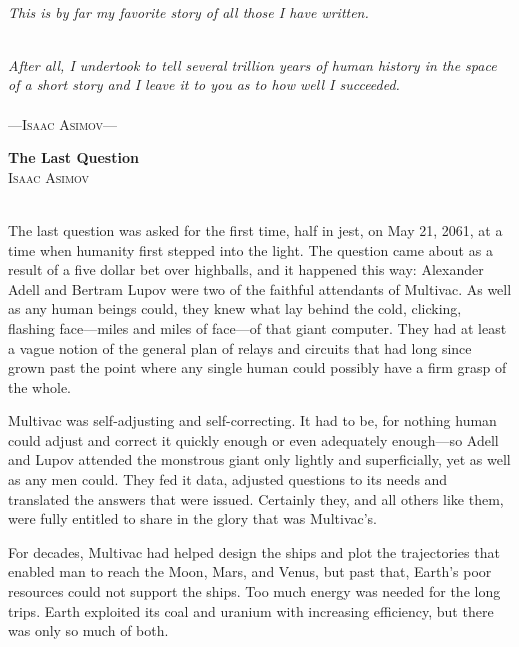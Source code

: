 \documentclass[11pt,twocolumn,paper=a5,pagesize,twoside]{article}
\newcommand{\initial}[1]{ \lettrine[lines=3,lhang=0.3,nindent=0em]{  {\textsf{#1}}}{}}
\begin{document}

%

\newpage
\
\newpage

\thispagestyle{empty}
\vspace*{2cm}

\begin{center}
\textit{This is by far my favorite story of all those I have written.}

\ \\

\textit{After all, I undertook to tell several trillion years of human history 
in the space of a short story and I leave it to you as to how well I 
succeeded.}
\\ \ \\

---\textsc{Isaac Asimov}---
\end{center}

\newpage
\setcounter{page}{1}

{
	\textbf{The Last Question}\\
	\textsc{Isaac Asimov}\\
}
\ \\



\pagebreak


\initial{T}he last question was asked for the first time, half in jest, on May 21, 
2061, at a time when humanity first stepped into the light. The question
came about as a result of a five dollar bet over highballs, and it happened
this way:
Alexander Adell and Bertram Lupov were two of the faithful attendants of 
Multivac. As well as any human beings could, they knew what lay behind the 
cold, clicking, flashing face---miles and miles of face---of that giant
computer. They had at least a vague notion of the general plan of relays 
and circuits that had long since grown past the point where any single 
human could possibly have a firm grasp of the whole.

Multivac was self-adjusting and self-correcting. It had to be, for nothing 
human could adjust and correct it quickly enough or even adequately 
enough---so Adell and Lupov attended the monstrous giant only lightly and 
superficially, yet as well as any men could. They fed it data, adjusted 
questions to its needs and translated the answers that were issued. 
Certainly they, and all others like them, were fully entitled to share 
in the glory that was Multivac's.

For decades, Multivac had helped design the ships and plot the trajectories
that enabled man to reach the Moon, Mars, and Venus, but past that, 
Earth's poor resources could not support the ships. Too much energy was 
needed for the long trips. Earth exploited its coal and uranium with 
increasing efficiency, but there was only so much of both.
\end{document}
